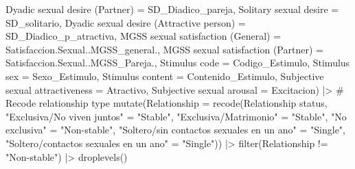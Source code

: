 \documentclass[
  bookmarksnumbered]{article}
\newenvironment{Shaded}{\begin{snugshade}}{\end{snugshade}}
\newcommand{\AttributeTok}[1]{\textcolor[rgb]{0.80,0.80,0.80}{#1}}
\newcommand{\CommentTok}[1]{\textcolor[rgb]{0.50,0.62,0.50}{#1}}
\newcommand{\FunctionTok}[1]{\textcolor[rgb]{0.94,0.94,0.56}{#1}}
\newcommand{\NormalTok}[1]{\textcolor[rgb]{0.80,0.80,0.80}{#1}}
\newcommand{\OtherTok}[1]{\textcolor[rgb]{0.94,0.94,0.56}{#1}}
\newcommand{\SpecialCharTok}[1]{\textcolor[rgb]{0.86,0.64,0.64}{#1}}
\newcommand{\StringTok}[1]{\textcolor[rgb]{0.80,0.58,0.58}{#1}}
\begin{document}
\begin{Shaded}
\begin{Highlighting}[]
         \StringTok{\textasciigrave{}}\AttributeTok{Dyadic sexual desire (Partner)}\StringTok{\textasciigrave{}} \OtherTok{=}\NormalTok{ SD\_Diadico\_pareja,}
         \StringTok{\textasciigrave{}}\AttributeTok{Solitary sexual desire}\StringTok{\textasciigrave{}} \OtherTok{=}\NormalTok{ SD\_solitario,}
         \StringTok{\textasciigrave{}}\AttributeTok{Dyadic sexual desire (Attractive person)}\StringTok{\textasciigrave{}} \OtherTok{=}\NormalTok{ SD\_Diadico\_p\_atractiva,}
         \StringTok{\textasciigrave{}}\AttributeTok{MGSS sexual satisfaction (General)}\StringTok{\textasciigrave{}} \OtherTok{=}\NormalTok{ Satisfaccion.Sexual..MGSS\_general.,}
         \StringTok{\textasciigrave{}}\AttributeTok{MGSS sexual satisfaction (Partner)}\StringTok{\textasciigrave{}} \OtherTok{=}\NormalTok{ Satisfaccion.Sexual..MGSS\_Pareja.,}
         \StringTok{\textasciigrave{}}\AttributeTok{Stimulus code}\StringTok{\textasciigrave{}} \OtherTok{=}\NormalTok{ Codigo\_Estimulo,}
         \StringTok{\textasciigrave{}}\AttributeTok{Stimulus sex}\StringTok{\textasciigrave{}} \OtherTok{=}\NormalTok{ Sexo\_Estimulo,}
         \StringTok{\textasciigrave{}}\AttributeTok{Stimulus content}\StringTok{\textasciigrave{}} \OtherTok{=}\NormalTok{ Contenido\_Estimulo,}
         \StringTok{\textasciigrave{}}\AttributeTok{Subjective sexual attractiveness}\StringTok{\textasciigrave{}} \OtherTok{=}\NormalTok{ Atractivo,}
         \StringTok{\textasciigrave{}}\AttributeTok{Subjective sexual arousal}\StringTok{\textasciigrave{}} \OtherTok{=}\NormalTok{ Excitacion) }\SpecialCharTok{|\textgreater{}}
  \CommentTok{\# Recode relationship type}
  \FunctionTok{mutate}\NormalTok{(}\AttributeTok{Relationship =} \FunctionTok{recode}\NormalTok{(}\StringTok{\textasciigrave{}}\AttributeTok{Relationship status}\StringTok{\textasciigrave{}}\NormalTok{,}
                               \StringTok{"Exclusiva/No viven juntos"} \OtherTok{=} \StringTok{"Stable"}\NormalTok{,}
                               \StringTok{"Exclusiva/Matrimonio"} \OtherTok{=} \StringTok{"Stable"}\NormalTok{,}
                               \StringTok{"No exclusiva"} \OtherTok{=} \StringTok{"Non{-}stable"}\NormalTok{,}
                               \StringTok{"Soltero/sin contactos sexuales en un ano"} \OtherTok{=} \StringTok{"Single"}\NormalTok{,}
                               \StringTok{"Soltero/contactos sexuales en un ano"} \OtherTok{=} \StringTok{"Single"}\NormalTok{)) }\SpecialCharTok{|\textgreater{}} 
  \FunctionTok{filter}\NormalTok{(Relationship }\SpecialCharTok{!=} \StringTok{"Non{-}stable"}\NormalTok{) }\SpecialCharTok{|\textgreater{}} 
  \FunctionTok{droplevels}\NormalTok{()}
\end{Highlighting}
\end{Shaded}
\end{document}
